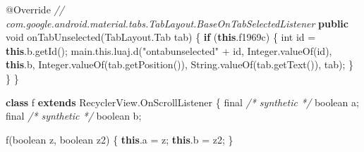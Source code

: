 \documentclass[
]{article}
\newenvironment{Shaded}{}{}
\newcommand{\AttributeTok}[1]{\textcolor[rgb]{0.49,0.56,0.16}{#1}}
\newcommand{\BuiltInTok}[1]{\textcolor[rgb]{0.00,0.50,0.00}{#1}}
\newcommand{\CommentTok}[1]{\textcolor[rgb]{0.38,0.63,0.69}{\textit{#1}}}
\newcommand{\ControlFlowTok}[1]{\textcolor[rgb]{0.00,0.44,0.13}{\textbf{#1}}}
\newcommand{\DataTypeTok}[1]{\textcolor[rgb]{0.56,0.13,0.00}{#1}}
\newcommand{\FunctionTok}[1]{\textcolor[rgb]{0.02,0.16,0.49}{#1}}
\newcommand{\KeywordTok}[1]{\textcolor[rgb]{0.00,0.44,0.13}{\textbf{#1}}}
\newcommand{\NormalTok}[1]{#1}
\newcommand{\OperatorTok}[1]{\textcolor[rgb]{0.40,0.40,0.40}{#1}}
\newcommand{\StringTok}[1]{\textcolor[rgb]{0.25,0.44,0.63}{#1}}
\begin{document}
\begin{Shaded}
\begin{Highlighting}[]
        \AttributeTok{@Override} \CommentTok{// com.google.android.material.tabs.TabLayout.BaseOnTabSelectedListener}
        \KeywordTok{public} \DataTypeTok{void} \FunctionTok{onTabUnselected}\OperatorTok{(}\NormalTok{TabLayout}\OperatorTok{.}\FunctionTok{Tab}\NormalTok{ tab}\OperatorTok{)} \OperatorTok{\{}
            \ControlFlowTok{if} \OperatorTok{(}\KeywordTok{this}\OperatorTok{.}\FunctionTok{f1969c}\OperatorTok{)} \OperatorTok{\{}
                \DataTypeTok{int}\NormalTok{ id }\OperatorTok{=} \KeywordTok{this}\OperatorTok{.}\FunctionTok{b}\OperatorTok{.}\FunctionTok{getId}\OperatorTok{();}
\NormalTok{                main}\OperatorTok{.}\FunctionTok{this}\OperatorTok{.}\FunctionTok{luaj}\OperatorTok{.}\FunctionTok{d}\OperatorTok{(}\StringTok{"ontabunselected"} \OperatorTok{+}\NormalTok{ id}\OperatorTok{,} \BuiltInTok{Integer}\OperatorTok{.}\FunctionTok{valueOf}\OperatorTok{(}\NormalTok{id}\OperatorTok{),} \KeywordTok{this}\OperatorTok{.}\FunctionTok{b}\OperatorTok{,} \BuiltInTok{Integer}\OperatorTok{.}\FunctionTok{valueOf}\OperatorTok{(}\NormalTok{tab}\OperatorTok{.}\FunctionTok{getPosition}\OperatorTok{()),} \BuiltInTok{String}\OperatorTok{.}\FunctionTok{valueOf}\OperatorTok{(}\NormalTok{tab}\OperatorTok{.}\FunctionTok{getText}\OperatorTok{()),}\NormalTok{ tab}\OperatorTok{);}
            \OperatorTok{\}}
        \OperatorTok{\}}
    \OperatorTok{\}}

    \KeywordTok{class}\NormalTok{ f }\KeywordTok{extends}\NormalTok{ RecyclerView}\OperatorTok{.}\FunctionTok{OnScrollListener} \OperatorTok{\{}
        \DataTypeTok{final} \CommentTok{/* synthetic */} \DataTypeTok{boolean}\NormalTok{ a}\OperatorTok{;}
        \DataTypeTok{final} \CommentTok{/* synthetic */} \DataTypeTok{boolean}\NormalTok{ b}\OperatorTok{;}

        \FunctionTok{f}\OperatorTok{(}\DataTypeTok{boolean}\NormalTok{ z}\OperatorTok{,} \DataTypeTok{boolean}\NormalTok{ z2}\OperatorTok{)} \OperatorTok{\{}
            \KeywordTok{this}\OperatorTok{.}\FunctionTok{a} \OperatorTok{=}\NormalTok{ z}\OperatorTok{;}
            \KeywordTok{this}\OperatorTok{.}\FunctionTok{b} \OperatorTok{=}\NormalTok{ z2}\OperatorTok{;}
        \OperatorTok{\}}


\end{Highlighting}
\end{Shaded}
\end{document}

